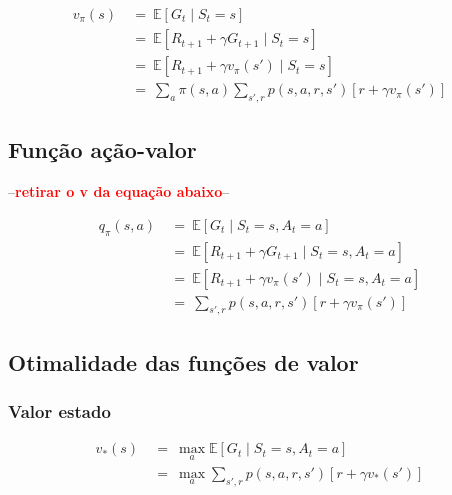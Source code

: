 \documentclass{article}
\newcommand{\todo}[1]{ --\textcolor{red}{\textbf{#1}}--}
\begin{document}
            \begin{equation}
            \begin{split}
                v_{\pi}(s) & \ = \ \mathbb{E}[G_t \mid S_t = s] \\
                & \ = \ \mathbb{E}[R_{t+1} + \gamma G_{t+1} \mid S_t = s] \\
                & \ = \ \mathbb{E}[R_{t+1} + \gamma v_{\pi}(s') \mid S_t = s] \\
                & \ = \ \sum_{a} \pi(s,a) \sum_{s', r} p(s, a, r, s') [r + \gamma v_{\pi}(s')]
            \end{split}
            \end{equation}
        
        \subsection{Função ação-valor}
        
            \todo{retirar o v da equação abaixo}

            \begin{equation}            
            \begin{split}
                q_{\pi}(s, a) & \ = \ \mathbb{E}[G_t \mid S_t = s, A_t = a] \\
                & \ = \ \mathbb{E}[R_{t+1} + \gamma G_{t+1} \mid S_t = s, A_t = a] \\
                & \ = \ \mathbb{E}[R_{t+1} + \gamma v_{\pi}(s') \mid S_t = s, A_t = a] \\
                & \ = \ \sum_{s', r} p(s, a, r, s') [r + \gamma v_{\pi}(s')]
            \end{split}
            \end{equation}
        
        \subsection{Otimalidade das funções de valor}
        
            \subsubsection{Valor estado}
            
                \begin{equation}
                \begin{split}
                    v_*(s) & \ = \ \max_{a} \mathbb{E}[G_t \mid S_t = s, A_t = a] \\
                    & \ = \ \max_{a} \sum_{s', r} p(s, a, r, s') [r + \gamma v_*(s')]
                \end{split}
                \end{equation}
            
\end{document}

